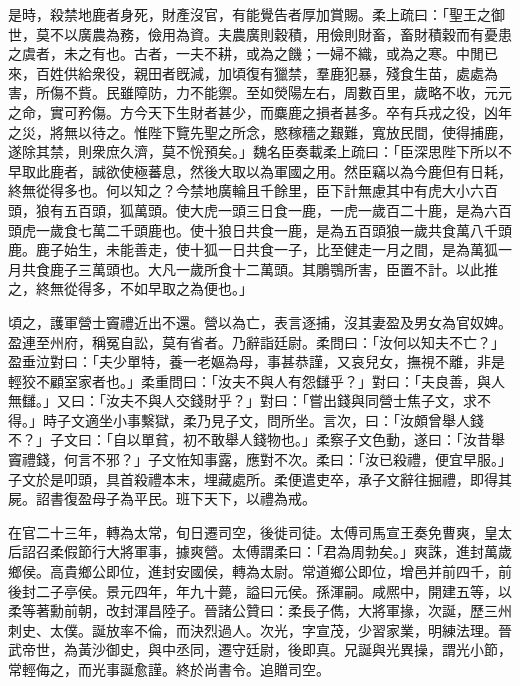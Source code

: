 \begin{pinyinscope}
是時，殺禁地鹿者身死，財產沒官，有能覺告者厚加賞賜。柔上疏曰：「聖王之御世，莫不以廣農為務，儉用為資。夫農廣則穀積，用儉則財畜，畜財積穀而有憂患之虞者，未之有也。古者，一夫不耕，或為之饑；一婦不織，或為之寒。中閒已來，百姓供給衆役，親田者旣減，加頃復有獵禁，羣鹿犯暴，殘食生苗，處處為害，所傷不貲。民雖障防，力不能禦。至如熒陽左右，周數百里，歲略不收，元元之命，實可矜傷。方今天下生財者甚少，而麋鹿之損者甚多。卒有兵戎之役，凶年之災，將無以待之。惟陛下覽先聖之所念，愍稼穡之艱難，寬放民間，使得捕鹿，遂除其禁，則衆庶久濟，莫不恱預矣。」魏名臣奏載柔上疏曰：「臣深思陛下所以不早取此鹿者，誠欲使極蕃息，然後大取以為軍國之用。然臣竊以為今鹿但有日耗，終無從得多也。何以知之？今禁地廣輪且千餘里，臣下計無慮其中有虎大小六百頭，狼有五百頭，狐萬頭。使大虎一頭三日食一鹿，一虎一歲百二十鹿，是為六百頭虎一歲食七萬二千頭鹿也。使十狼日共食一鹿，是為五百頭狼一歲共食萬八千頭鹿。鹿子始生，未能善走，使十狐一日共食一子，比至健走一月之間，是為萬狐一月共食鹿子三萬頭也。大凡一歲所食十二萬頭。其鵰鶚所害，臣置不計。以此推之，終無從得多，不如早取之為便也。」

頃之，護軍營士竇禮近出不還。營以為亡，表言逐捕，沒其妻盈及男女為官奴婢。盈連至州府，稱冤自訟，莫有省者。乃辭詣廷尉。柔問曰：「汝何以知夫不亡？」盈垂泣對曰：「夫少單特，養一老嫗為母，事甚恭謹，又哀兒女，撫視不離，非是輕狡不顧室家者也。」柔重問曰：「汝夫不與人有怨讎乎？」對曰：「夫良善，與人無讎。」又曰：「汝夫不與人交錢財乎？」對曰：「嘗出錢與同營士焦子文，求不得。」時子文適坐小事繫獄，柔乃見子文，問所坐。言次，曰：「汝頗曾舉人錢不？」子文曰：「自以單貧，初不敢舉人錢物也。」柔察子文色動，遂曰：「汝昔舉竇禮錢，何言不邪？」子文恠知事露，應對不次。柔曰：「汝已殺禮，便宜早服。」子文於是叩頭，具首殺禮本末，埋藏處所。柔便遣吏卒，承子文辭往掘禮，即得其屍。詔書復盈母子為平民。班下天下，以禮為戒。

在官二十三年，轉為太常，旬日遷司空，後徙司徒。太傅司馬宣王奏免曹爽，皇太后詔召柔假節行大將軍事，據爽營。太傅謂柔曰：「君為周勃矣。」爽誅，進封萬歲鄉侯。高貴鄉公即位，進封安國侯，轉為太尉。常道鄉公即位，增邑并前四千，前後封二子亭侯。景元四年，年九十薨，謚曰元侯。孫渾嗣。咸熈中，開建五等，以柔等著勳前朝，改封渾昌陸子。晉諸公贊曰：柔長子儁，大將軍掾，次誕，歷三州刺史、太僕。誕放率不倫，而決烈過人。次光，字宣茂，少習家業，明練法理。晉武帝世，為黃沙御史，與中丞同，遷守廷尉，後即真。兄誕與光異操，謂光小節，常輕侮之，而光事誕愈謹。終於尚書令。追贈司空。


\end{pinyinscope}